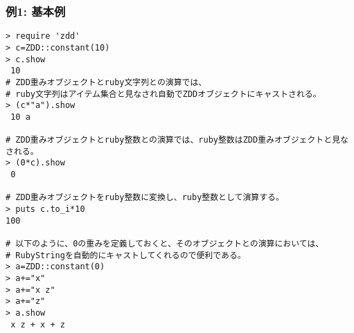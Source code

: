 \subsubsection*{例1: 基本例}



\begin{Verbatim}[baselinestretch=0.7,frame=single]
> require 'zdd'
> c=ZDD::constant(10)
> c.show
 10
# ZDD重みオブジェクトとruby文字列との演算では、
# ruby文字列はアイテム集合と見なされ自動でZDDオブジェクトにキャストされる。
> (c*"a").show
 10 a

# ZDD重みオブジェクトとruby整数との演算では、ruby整数はZDD重みオブジェクトと見なされる。
> (0*c).show
 0

# ZDD重みオブジェクトをruby整数に変換し、ruby整数として演算する。
> puts c.to_i*10
100

# 以下のように、0の重みを定義しておくと、そのオブジェクトとの演算においては、
# RubyStringを自動的にキャストしてくれるので便利である。
> a=ZDD::constant(0)
> a+="x"
> a+="x z"
> a+="z"
> a.show
 x z + x + z
\end{Verbatim}
